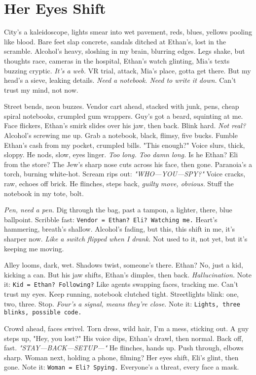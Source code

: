 \documentclass[12pt,oneside]{book} %
\newcommand{\note}[1]{\texttt{#1}}
\begin{document}
\chapter{Her Eyes Shift}

City’s a kaleidoscope, lights smear into wet pavement, reds, blues, yellows pooling like blood. Bare feet slap concrete, sandals ditched at Ethan’s, lost in the scramble. Alcohol’s heavy, sloshing in my brain, blurring edges. Legs shake, but thoughts race, cameras in the hospital, Ethan’s watch glinting, Mia’s texts buzzing cryptic. \textit{It’s a web.} VR trial, attack, Mia’s place, gotta get there. But my head’s a sieve, leaking details. \textit{Need a notebook. Need to write it down.} Can’t trust my mind, not now.

Street bends, neon buzzes. Vendor cart ahead, stacked with junk, pens, cheap spiral notebooks, crumpled gum wrappers. Guy’s got a beard, squinting at me. Face flickers, Ethan’s smirk slides over his jaw, then back. Blink hard. \textit{Not real?} Alcohol’s screwing me up. Grab a notebook, black, flimsy, five bucks. Fumble Ethan’s cash from my pocket, crumpled bills. "This enough?" Voice slurs, thick, sloppy. He nods, slow, eyes linger. \textit{Too long. Too damn long.} Is he Ethan? \textnormal{Eli} from the store? The Jew’s sharp nose cuts across his face, then gone. Paranoia’s a torch, burning white-hot. Scream rips out: \textit{"WHO—YOU—SPY?"} Voice cracks, raw, echoes off brick. He flinches, steps back, \textit{guilty move, obvious.} Stuff the notebook in my tote, bolt.

\textit{Pen, need a pen.} Dig through the bag, past a tampon, a lighter, there, blue ballpoint. Scribble fast: \note{Vendor = Ethan? Eli? Watching me.} Heart’s hammering, breath’s shallow. Alcohol’s fading, but this, this shift in me, it’s sharper now. \textit{Like a switch flipped when I drank.} Not used to it, not yet, but it’s keeping me moving.

Alley looms, dark, wet. Shadows twist, someone’s there. Ethan? No, just a kid, kicking a can. But his jaw shifts, Ethan’s dimples, then back. \textit{Hallucination.} Note it: \note{Kid = Ethan? Following?} Like agents swapping faces, tracking me. Can’t trust my eyes. Keep running, notebook clutched tight. Streetlights blink: one, two, three. Stop. \textit{Four’s a signal, means they’re close.} Note it: \note{Lights, three blinks, possible code.}

Crowd ahead, faces swivel. Torn dress, wild hair, I’m a mess, sticking out. A guy steps up, "Hey, you lost?" His voice dips, Ethan’s drawl, then normal. Back off, fast. \textit{"STAY—BACK—SETUP—"} He flinches, hands up. Push through, elbows sharp. Woman next, holding a phone, filming? Her eyes shift, \textnormal{Eli}’s glint, then gone. Note it: \note{Woman = Eli? Spying.} Everyone’s a threat, every face a mask.
\end{document}

